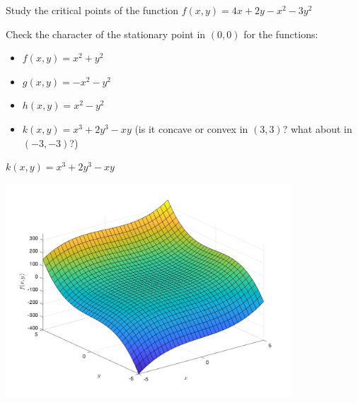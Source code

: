 \documentclass[c]{beamer}
\begin{document}
\begin{frame}
\begin{Exercise}
  Study the critical points of the function $f(x,y)=4x+2y-x^2-3y^2$
\end{Exercise}


\begin{Exercise}
    Check the character of the stationary point in $(0,0)$ for the functions:
    \begin{itemize}
      \item $f(x,y)=x^2+y^2$
      \item $g(x,y)=-x^2-y^2$
      \item $h(x,y)=x^2-y^2$
      \item $k(x,y)=x^3+2y^3-xy$ (is it concave or convex in $(3,3)$? what about in $(-3,-3)$?)
    \end{itemize}

\end{Exercise}

\end{frame}
\begin{frame}{$k(x,y)=x^3+2y^3-xy$}
  \begin{center}
    \includegraphics[width=0.8\textwidth]{../figures/x3plus2y3minusxy.png}
  \end{center}
\end{frame}
\end{document}
